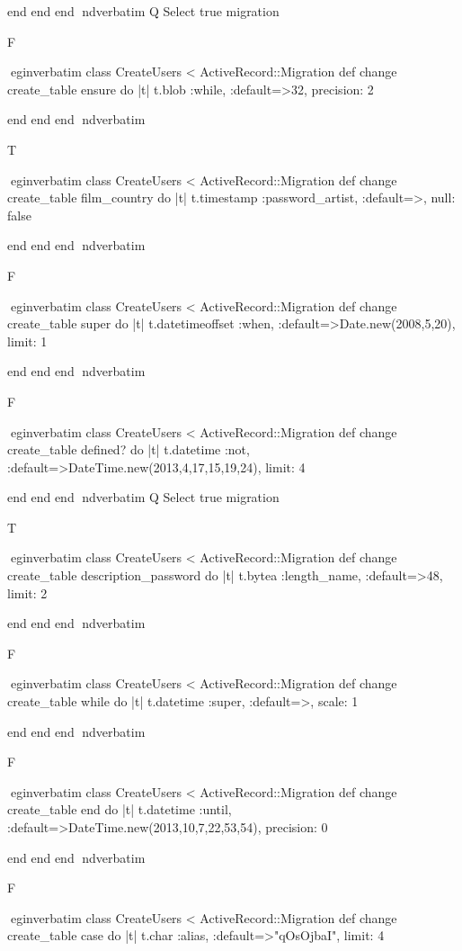     end 
  end 
end
nd{verbatim}
Q
 Select true migration

F

egin{verbatim}
 class CreateUsers < ActiveRecord::Migration 
  def change 
    create_table ensure do |t| 
      t.blob :while, :default=>32, precision: 2
    
    end 
  end 
end
nd{verbatim}

T

egin{verbatim}
 class CreateUsers < ActiveRecord::Migration 
  def change 
    create_table film_country do |t| 
      t.timestamp :password_artist, :default=>, null: false
    
    end 
  end 
end
nd{verbatim}

F

egin{verbatim}
 class CreateUsers < ActiveRecord::Migration 
  def change 
    create_table super do |t| 
      t.datetimeoffset :when, :default=>Date.new(2008,5,20), limit: 1
    
    end 
  end 
end
nd{verbatim}

F

egin{verbatim}
 class CreateUsers < ActiveRecord::Migration 
  def change 
    create_table defined? do |t| 
      t.datetime :not, :default=>DateTime.new(2013,4,17,15,19,24), limit: 4
    
    end 
  end 
end
nd{verbatim}
Q
 Select true migration

T

egin{verbatim}
 class CreateUsers < ActiveRecord::Migration 
  def change 
    create_table description_password do |t| 
      t.bytea :length_name, :default=>48, limit: 2
    
    end 
  end 
end
nd{verbatim}

F

egin{verbatim}
 class CreateUsers < ActiveRecord::Migration 
  def change 
    create_table while do |t| 
      t.datetime :super, :default=>, scale: 1
    
    end 
  end 
end
nd{verbatim}

F

egin{verbatim}
 class CreateUsers < ActiveRecord::Migration 
  def change 
    create_table end do |t| 
      t.datetime :until, :default=>DateTime.new(2013,10,7,22,53,54), precision: 0
    
    end 
  end 
end
nd{verbatim}

F

egin{verbatim}
 class CreateUsers < ActiveRecord::Migration 
  def change 
    create_table case do |t| 
      t.char :alias, :default=>"qOsOjbaI", limit: 4
    
